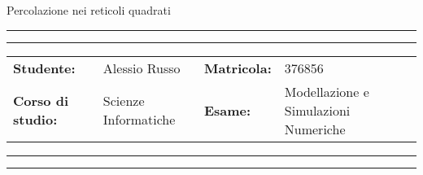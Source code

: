 \documentclass[11pt]{article}
\newcommand{\studentname}{Alessio Russo}
\newcommand{\studentnumber}{376856}
\newcommand{\course}{Scienze Informatiche}
\newcommand{\exam}{Modellazione e Simulazioni Numeriche}
\begin{document}
\begin{center}
{\Huge{Percolazione nei reticoli quadrati}} \\
\end{center}

\vspace{5mm}
\hrule
\vspace{1mm}
\hrule
\vspace{3mm}
\begin{center}
	\begin{tabular}{llll}
		\textbf{Studente: } & {\studentname}  & \textbf{Matricola:}  & {\studentnumber}  \\ 
		\textbf{Corso di studio: } & {\course}& \textbf{Esame:} & {\exam}\\ 
	\end{tabular}
\end{center}
\vspace{3mm}
\hrule
\vspace{1mm}
\hrule





\end{document}

